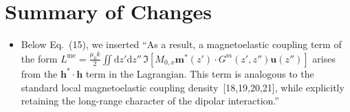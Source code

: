 \documentclass[11pt]{revtex4-2}
\begin{document}
\clearpage
\section*{Summary of Changes}
\begin{itemize}
    \item Below Eq.~(15), we inserted ``As a result, a magnetoelastic coupling term of the form
    $L^{\mathrm{me}}
    =
    \frac{\mu_0 k}{2}
    \iint\mathrm{d}z'\mathrm{d}z''\,
    \Im\left[
    M_{0,x}\bm{m}^*(z')\cdot G^m(z',z'')\bm{u}(z'')
    \right]$
arises from the $\bm{h}^*\cdot\bm{h}$ term in the Lagrangian. This term is analogous to the standard local magnetoelastic coupling density~[18,19,20,21], while explicitly retaining the long-range character of the dipolar interaction.''
\end{itemize}



\end{document}
